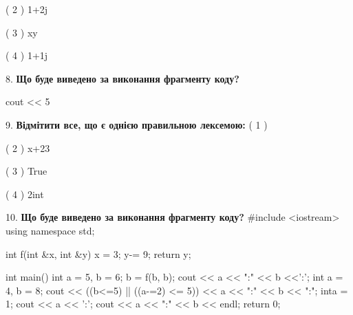 \documentclass[11pt]{article}
\begin{document}
( 2 ) 1+2j

( 3 ) xy

( 4 ) 1+1j
\vspace{5mm}

8. \textbf{Що буде виведено за виконання фрагменту коду?}

cout << 5 %
\vspace{5mm}

9. %
\textbf{Відмітити все, що є однією правильною лексемою:}
( 1 ) %

( 2 ) x+23

( 3 ) True

( 4 ) 2int
\vspace{5mm}

10. \textbf{Що буде виведено за виконання фрагменту коду?}
#include <iostream>
using namespace std;

int f(int &x, int &y){
    x = 3;
    y-= 9;
    return y;
}

int main(){
    int a = 5, b = 6;
    b = f(b, b);
    cout << a << ":" << b <<':';
    {
        int a = 4, b = 8;
        cout << ((b<=5) || ((a-=2) <= 5))
             << a << ":" << b << ":";
    }
    {
        inta = 1;
        cout << a << ':';
    }
    cout << a << ":" << b << endl;
    return 0;
}

\vspace{5mm}

\newpage
\end{document}
